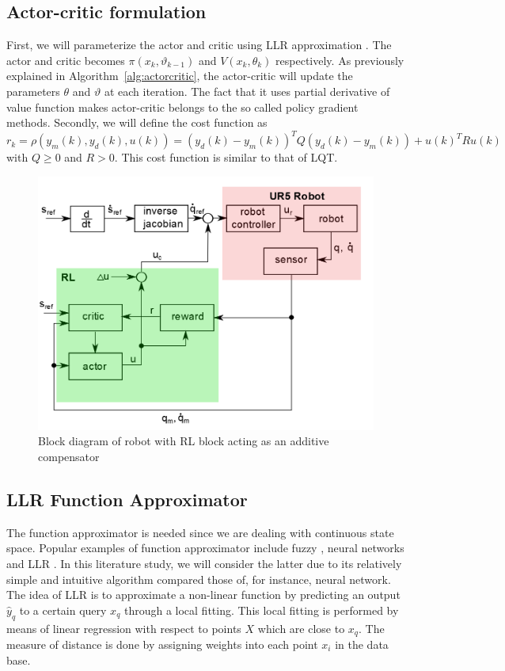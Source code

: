 \subsection{Actor-critic formulation}
First, we will parameterize the actor and critic using \ac {LLR} approximation \cite{Grondman6096441}. The actor and critic becomes $\pi(x_k,\vartheta_{k-1})$ and $V(x_k,\theta_k)$ respectively. As previously explained in Algorithm~\ref{alg:actorcritic}, the actor-critic will update the parameters $\theta$ and $\vartheta$ at each iteration. The fact that it uses partial derivative of value function makes actor-critic belongs to the so called policy gradient methods. Secondly, we will define the cost function as
\begin{equation}
r_k = \rho(y_m(k), y_d(k), u(k)) = (y_d(k) - y_m(k))^TQ(y_d(k) - y_m(k)) + u(k)^TRu(k)
\end{equation}
with $ Q \geq 0 $ and $ R>0 $. This cost function is similar to that of \ac {LQT}. 


\begin{figure}[h]
\centering
\includegraphics[width=0.7\linewidth]{blockdiagram}
\caption{Block diagram of robot with \ac{RL} block acting as an additive compensator}
\label{fig:blockdiagram}
\end{figure}

\subsection{\ac{LLR} Function Approximator}
The function approximator is needed since we are dealing with continuous state space. Popular examples of function approximator include fuzzy \cite{Efe2014}, neural networks \cite{Kiumarsi6918527} and \ac {LLR} \cite{Grondman6096441}. In this literature study, we will consider the latter due to its relatively simple and intuitive algorithm compared those of, for instance, neural network. The idea of \ac {LLR} is to approximate a non-linear function by predicting an output $\hat{y}_q$ to a certain query $x_q$ through a local fitting. This local fitting is performed by means of linear regression with respect to points $X$ which are close to $x_q$.  
The measure of distance is done by assigning weights into each point $x_i$ in the data base. 

